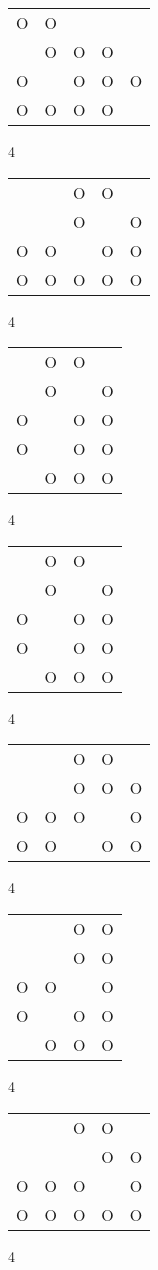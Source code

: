 \begin{tabular}{|m{0.2cm}m{0.2cm}m{0.2cm}m{0.2cm}m{0.2cm}|}\hline
O&O& & & \\
 &O&O&O& \\
O& &O&O&O\\
O&O&O&O& \\
\hline\end{tabular}4
\begin{tabular}{|m{0.2cm}m{0.2cm}m{0.2cm}m{0.2cm}m{0.2cm}|}\hline
 & &O&O& \\
 & &O& &O\\
O&O& &O&O\\
O&O&O&O&O\\
\hline\end{tabular}4
\begin{tabular}{|m{0.2cm}m{0.2cm}m{0.2cm}m{0.2cm}|}\hline
 &O&O& \\
 &O& &O\\
O& &O&O\\
O& &O&O\\
 &O&O&O\\
\hline\end{tabular}4
\begin{tabular}{|m{0.2cm}m{0.2cm}m{0.2cm}m{0.2cm}|}\hline
 &O&O& \\
 &O& &O\\
O& &O&O\\
O& &O&O\\
 &O&O&O\\
\hline\end{tabular}4
\begin{tabular}{|m{0.2cm}m{0.2cm}m{0.2cm}m{0.2cm}m{0.2cm}|}\hline
 & &O&O& \\
 & &O&O&O\\
O&O&O& &O\\
O&O& &O&O\\
\hline\end{tabular}4
\begin{tabular}{|m{0.2cm}m{0.2cm}m{0.2cm}m{0.2cm}|}\hline
 & &O&O\\
 & &O&O\\
O&O& &O\\
O& &O&O\\
 &O&O&O\\
\hline\end{tabular}4
\begin{tabular}{|m{0.2cm}m{0.2cm}m{0.2cm}m{0.2cm}m{0.2cm}|}\hline
 & &O&O& \\
 & & &O&O\\
O&O&O& &O\\
O&O&O&O&O\\
\hline\end{tabular}4
